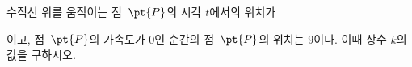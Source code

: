 수직선 위를 움직이는 점~$\pt{P}$의 시각 $t$에서의 위치가\par\smallskip{}\par\smallskip\noindent 이고, 점~$\pt{P}$의 가속도가 $0$인 순간의 점~$\pt{P}$의 위치는 $9$이다. 이때 상수 $k$의 값을 구하시오.
